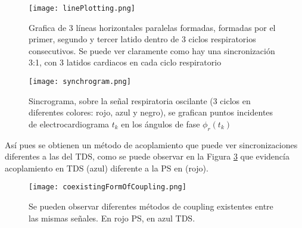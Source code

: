 \documentclass[twoside,twocolumn]{article}
\begin{document}
  \begin{figure}[H]
    \texttt{[image: linePlotting.png]}
    \caption{Grafica de 3 líneas horizontales paralelas formadas, formadas por el primer, segundo y tercer latido dentro de 3 ciclos respiratorios consecutivos. Se puede ver claramente como hay una sincronización 3:1, con 3 latidos cardiacos en cada ciclo respiratorio}
    \label{fig:linePlotting}
  \end{figure}

  \begin{figure}[H]
    \texttt{[image: synchrogram.png]}
    \caption{Sincrograma, sobre la señal respiratoria oscilante (3 ciclos en diferentes colores: rojo, azul y negro), se grafican puntos incidentes de electrocardiograma $t_k$ en los ángulos de fase $\phi_r(t_k)$\cite{bartsch2014coexisting}}
    \label{fig:synchrogram}
  \end{figure}
  Así pues se obtienen un método de acoplamiento que puede ver sincronizaciones diferentes a las del TDS, como se puede observar en la Figura \ref{fig:coexistingFormOfCoupling} que evidencía acoplamiento en TDS (azul) diferente a la PS en (rojo).
  \begin{figure}[H]
    \texttt{[image: coexistingFormOfCoupling.png]}
    \caption{Se pueden observar diferentes métodos de coupling existentes entre las mismas señales. En rojo PS, en azul TDS.}
    \label{fig:coexistingFormOfCoupling}
  \end{figure}
\renewcommand\refname{Referencias}
\printbibliography
\end{document}
